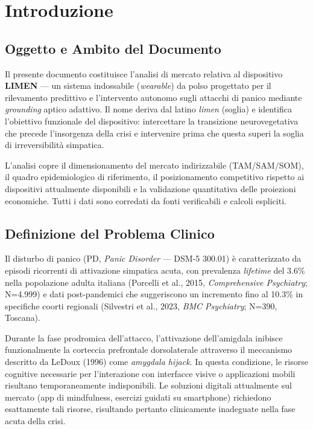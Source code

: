 \documentclass[12pt,a4paper]{article}
\begin{document}
\section{Introduzione}

\subsection{Oggetto e Ambito del Documento}
Il presente documento costituisce l'analisi di mercato relativa al dispositivo \textbf{LIMEN} --- un sistema indossabile (\textit{wearable}) da polso progettato per il rilevamento predittivo e l'intervento autonomo sugli attacchi di panico mediante \textit{grounding} aptico adattivo. Il nome deriva dal latino \textit{limen} (soglia) e identifica l'obiettivo funzionale del dispositivo: intercettare la transizione neurovegetativa che precede l'insorgenza della crisi e intervenire prima che questa superi la soglia di irreversibilità simpatica.

L'analisi copre il dimensionamento del mercato indirizzabile (TAM/SAM/SOM), il quadro epidemiologico di riferimento, il posizionamento competitivo rispetto ai dispositivi attualmente disponibili e la validazione quantitativa delle proiezioni economiche. Tutti i dati sono corredati da fonti verificabili e calcoli espliciti.

\subsection{Definizione del Problema Clinico}
Il disturbo di panico (PD, \textit{Panic Disorder} --- DSM-5 300.01) è caratterizzato da episodi ricorrenti di attivazione simpatica acuta, con prevalenza \textit{lifetime} del 3.6\% nella popolazione adulta italiana (Porcelli et al., 2015, \textit{Comprehensive Psychiatry}; N=4.999) e dati post-pandemici che suggeriscono un incremento fino al 10.3\% in specifiche coorti regionali (Silvestri et al., 2023, \textit{BMC Psychiatry}; N=390, Toscana).

Durante la fase prodromica dell'attacco, l'attivazione dell'amigdala inibisce funzionalmente la corteccia prefrontale dorsolaterale attraverso il meccanismo descritto da LeDoux (1996) come \textit{amygdala hijack}. In questa condizione, le risorse cognitive necessarie per l'interazione con interfacce visive o applicazioni mobili risultano temporaneamente indisponibili. Le soluzioni digitali attualmente sul mercato (app di mindfulness, esercizi guidati su smartphone) richiedono esattamente tali risorse, risultando pertanto clinicamente inadeguate nella fase acuta della crisi.
\end{document}

